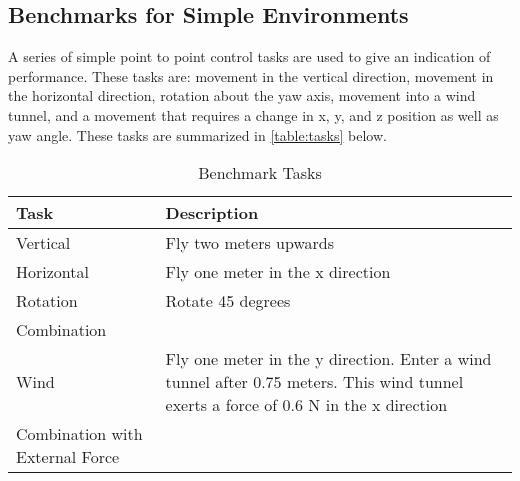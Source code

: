 \documentclass[letterpaper,12pt,titlepage,oneside,final]{book}
\begin{document}
\subsection{Benchmarks for Simple Environments}

A series of simple point to point control tasks are used to give an indication of performance. 
These tasks are: movement in the vertical direction, movement in the horizontal direction, rotation about the yaw axis, movement into a wind tunnel, and a movement that requires a change in x, y, and z position as well as yaw angle. 
These tasks are summarized in \autoref{table:tasks} below.


\begin{table}
\caption{Benchmark Tasks} \label{table:tasks}
\begin{center}
\begin{tabular}{| l | p{9cm} |}

\hline
Task & Description \\ \hline
Vertical & Fly two meters upwards \\ \hline
Horizontal & Fly one meter in the x direction \\ \hline
Rotation & Rotate 45 degrees \\ \hline
Combination & \\ \hline
Wind & Fly one meter in the y direction. Enter a wind tunnel after 0.75 meters. This wind tunnel exerts a force of 0.6 N in the x direction \\ \hline
Combination with External Force & \\ \hline

\end{tabular}
\end{center}
\end{table}


\end{document}
